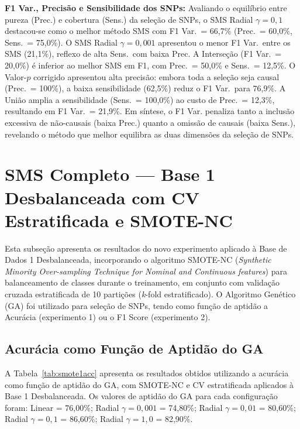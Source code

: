 \documentclass[
    12pt,
    a4paper,
    oneside,
    english,
    french,
    spanish,
    brazil
    ]{abntex2}
\newcommand{\novo}[1]{\textcolor{corNova}{#1}}
\begin{document}
\novo{\textbf{F1 Var., Precisão e Sensibilidade dos SNPs:} Avaliando o equilíbrio entre pureza (Prec.) e cobertura (Sens.) da seleção de SNPs, o SMS Radial $\gamma=0{,}1$ destacou-se como o melhor método SMS com F1 Var.\ = 66,7\% (Prec.\ = 60,0\%, Sens.\ = 75,0\%). O SMS Radial $\gamma=0{,}001$ apresentou o menor F1 Var.\ entre os SMS (21,1\%), reflexo de alta Sens.\ com baixa Prec. A Interseção (F1 Var.\ = 20,0\%) é inferior ao melhor SMS em F1, com Prec.\ = 50,0\% e Sens.\ = 12,5\%. O Valor-$p$ corrigido apresentou alta precisão: embora toda a seleção seja causal (Prec.\ = 100\%), a baixa sensibilidade (62,5\%) reduz o F1 Var.\ para 76,9\%. A União amplia a sensibilidade (Sens.\ = 100,0\%) ao custo de Prec.\ = 12,3\%, resultando em F1 Var.\ = 21,9\%. Em síntese, o F1 Var. penaliza tanto a inclusão excessiva de não-causais (baixa Prec.) quanto a omissão de causais (baixa Sens.), revelando o método que melhor equilibra as duas dimensões da seleção de SNPs.}
\section{SMS Completo --- Base 1 Desbalanceada com CV Estratificada e SMOTE-NC}

\novo{Esta subseção apresenta os resultados do novo experimento aplicado à Base de Dados 1 Desbalanceada, incorporando o algoritmo SMOTE-NC (\textit{Synthetic Minority Over-sampling Technique for Nominal and Continuous features}) para balanceamento de classes durante o treinamento, em conjunto com validação cruzada estratificada de 10 partições (\textit{k}-fold estratificado). O Algoritmo Genético (GA) foi utilizado para seleção de SNPs, tendo como função de aptidão a Acurácia (experimento 1) ou o F1 Score (experimento 2).}

\subsection{Acurácia como Função de Aptidão do GA}

\novo{A Tabela~\ref{tab:smote1acc} apresenta os resultados obtidos utilizando a acurácia como função de aptidão do GA, com SMOTE-NC e CV estratificada aplicados à Base 1 Desbalanceada. Os valores de aptidão do GA para cada configuração foram: Linear = 76,00\%; Radial $\gamma{=}0{,}001$ = 74,80\%; Radial $\gamma{=}0{,}01$ = 80,60\%; Radial $\gamma{=}0{,}1$ = 86,60\%; Radial $\gamma{=}1{,}0$ = 82,90\%.}
\end{document}
